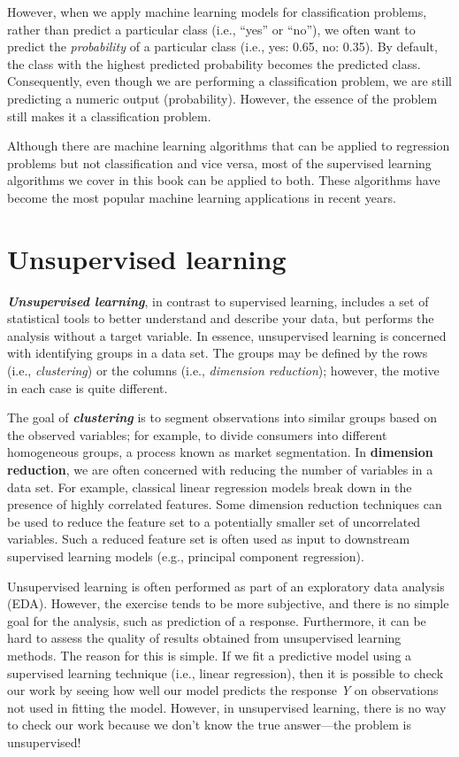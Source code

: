\documentclass[]{krantz}
\begin{document}
However, when we apply machine learning models for classification problems, rather than predict a particular class (i.e., ``yes'' or ``no''), we often want to predict the \emph{probability} of a particular class (i.e., yes: 0.65, no: 0.35). By default, the class with the highest predicted probability becomes the predicted class. Consequently, even though we are performing a classification problem, we are still predicting a numeric output (probability). However, the essence of the problem still makes it a classification problem.

Although there are machine learning algorithms that can be applied to regression problems but not classification and vice versa, most of the supervised learning algorithms we cover in this book can be applied to both. These algorithms have become the most popular machine learning applications in recent years.

\hypertarget{unsupervised-learning}{%
\section{Unsupervised learning}\label{unsupervised-learning}}

\textbf{\emph{Unsupervised learning}}, in contrast to supervised learning, includes a set of statistical tools to better understand and describe your data, but performs the analysis without a target variable. In essence, unsupervised learning is concerned with identifying groups in a data set. The groups may be defined by the rows (i.e., \emph{clustering}) or the columns (i.e., \emph{dimension reduction}); however, the motive in each case is quite different.

The goal of \textbf{\emph{clustering}} is to segment observations into similar groups based on the observed variables; for example, to divide consumers into different homogeneous groups, a process known as market segmentation. In \textbf{dimension reduction}, we are often concerned with reducing the number of variables in a data set. For example, classical linear regression models break down in the presence of highly correlated features. Some dimension reduction techniques can be used to reduce the feature set to a potentially smaller set of uncorrelated variables. Such a reduced feature set is often used as input to downstream supervised learning models (e.g., principal component regression).

Unsupervised learning is often performed as part of an exploratory data analysis (EDA). However, the exercise tends to be more subjective, and there is no simple goal for the analysis, such as prediction of a response. Furthermore, it can be hard to assess the quality of results obtained from unsupervised learning methods. The reason for this is simple. If we fit a predictive model using a supervised learning technique (i.e., linear regression), then it is possible to check our work by seeing how well our model predicts the response \emph{Y} on observations not used in fitting the model. However, in unsupervised learning, there is no way to check our work because we don't know the true answer---the problem is unsupervised!
\end{document}
